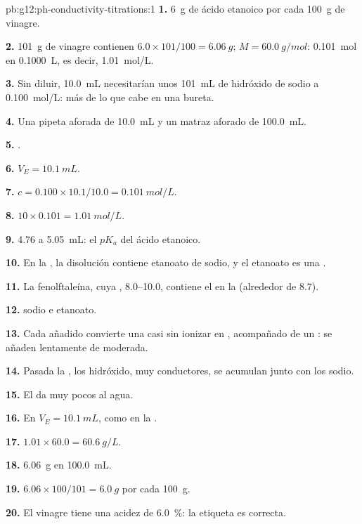 \begin{solution}{pb:g12:ph-conductivity-titrations:1}
\textbf{1.} \qty{6}{g} de ácido etanoico por cada \qty{100}{g} de vinagre.

\textbf{2.} \qty{101}{g} de vinagre contienen $6.0 \times 101/100 =
\qty{6.06}{g}$; $M = \qty{60.0}{g/mol}$: \qty{0.101}{mol} en
\qty{0.1000}{L}, es decir, \qty{1.01}{mol/L}.

\textbf{3.} Sin diluir, \qty{10.0}{mL} necesitarían unos \qty{101}{mL} de
hidróxido de sodio a \qty{0.100}{mol/L}: más de lo que cabe en una
bureta.

\textbf{4.} Una pipeta aforada de \qty{10.0}{mL} y un matraz aforado de
\qty{100.0}{mL}.

\textbf{5.} .

\textbf{6.} $V_E = \qty{10.1}{mL}$.

\textbf{7.} $c = 0.100 \times 10.1 / 10.0 = \qty{0.101}{mol/L}$.

\textbf{8.} $10 \times 0.101 = \qty{1.01}{mol/L}$.

\textbf{9.}  4.76 a \qty{5.05}{mL}: el $pK_a$ del ácido etanoico.

\textbf{10.} En la , la disolución contiene etanoato de sodio,
y el etanoato es una .

\textbf{11.} La fenolftaleína, cuya , 8.0--10.0, contiene el
 en la  (alrededor de 8.7).

\textbf{12.}  sodio e  etanoato.

\textbf{13.} Cada  añadido convierte una  casi sin
ionizar en , acompañado de un : se añaden lentamente
 de  moderada.

\textbf{14.} Pasada la , los  hidróxido, muy
conductores, se acumulan junto con los  sodio.

\textbf{15.} El  da muy pocos  al agua.

\textbf{16.} En $V_E = \qty{10.1}{mL}$, como en la .

\textbf{17.} $1.01 \times 60.0 = \qty{60.6}{g/L}$.

\textbf{18.} \qty{6.06}{g} en \qty{100.0}{mL}.

\textbf{19.} $6.06 \times 100 / 101 = \qty{6.0}{g}$ por cada
\qty{100}{g}.

\textbf{20.} El vinagre tiene una acidez de \qty{6.0}{\percent}: la etiqueta es
correcta.
\end{solution}
